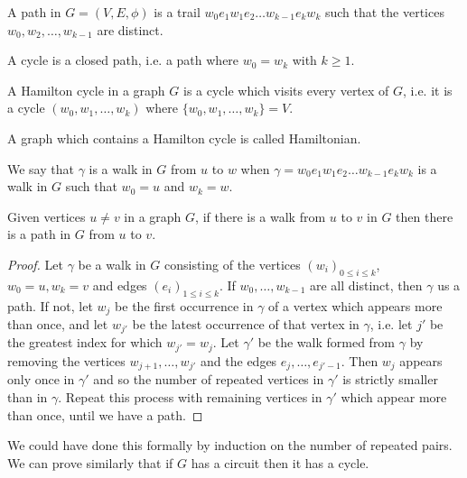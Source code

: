 \documentclass[10pt, a4paper]{article}
\begin{document}
\begin{definition}[Trail]
    A path in $G = (V, E, \phi)$ is a trail $w_0e_1w_1e_2\dotsc w_{k - 1}e_kw_k$ such that the vertices $w_0, w_2, \dotsc, w_{k - 1}$ are distinct.
\end{definition}
A cycle is a closed path,
i.e. a path where $w_0 = w_k$ with $k \geq 1$.

\begin{definition}
    A Hamilton cycle in a graph $G$ is a cycle  which visits every vertex of $G$,
    i.e. it is a cycle $(w_0, w_1, \dotsc, w_k)$ where $\{w_0, w_1, \dotsc, w_k\} = V$.
\end{definition}

A graph which contains a Hamilton cycle is called Hamiltonian.

We say that $\gamma$ is a walk in $G$ from $u$ to $w$ when $\gamma = w_0e_1w_1e_2\dotsc w_{k - 1}e_kw_k$ is a walk in $G$ such that $w_0 = u$ and $w_k = w$.

\begin{lemma}
    Given vertices $u \neq v$ in a graph $G$,
    if there is a walk from $u$ to $v$ in $G$ then there is a path in $G$ from $u$ to $v$.
    \begin{proof}
        Let $\gamma$ be a walk in $G$ consisting of the vertices $(w_i)_{0 \leq i \leq k}$,
        $w_0 = u, w_k = v$ and edges $(e_i)_{1 \leq i \leq k}$.
        If $w_0, \dotsc, w_{k - 1}$ are all distinct,
        then $\gamma$ us a path.
        If not,
        let $w_j$ be the first occurrence in $\gamma$ of a vertex which appears more than once,
        and let $w_{j'}$ be the latest occurrence of that vertex in $\gamma$,
        i.e. let $j'$ be the greatest index for which $w_{j'} = w_j$.
        Let $\gamma'$ be the walk formed from $\gamma$ by removing the vertices $w_{j + 1}, \dotsc, w_{j'}$ and the edges $e_j, \dotsc, e_{j' - 1}$.
        Then $w_j$ appears only once in $\gamma'$ and so the number of repeated vertices in $\gamma'$ is strictly smaller than in $\gamma$.
        Repeat this process with remaining vertices in $\gamma'$ which appear more than once,
        until we have a path.
    \end{proof}
\end{lemma}

We could have done this formally by induction on the number of repeated pairs.
We can prove similarly that if $G$ has a circuit then it has a cycle.
\end{document}
